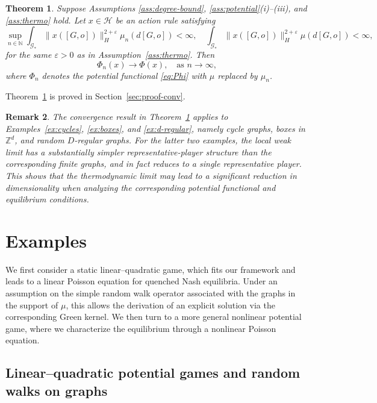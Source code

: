 \documentclass[11pt]{article}
\def\eps{\varepsilon}
\newcommand{\N}{{\mathbb N}}
\newtheorem{theorem}{Theorem}[section]
\newtheorem{remark}[theorem]{Remark}
\numberwithin{equation}{section}
\begin{document}
\begin{theorem}\label{thm:thermo-limit}
Suppose Assumptions \ref{ass:degree-bound}, \ref{ass:potential}(i)--(iii), and \ref{ass:thermo} hold. Let \(x\in\mathcal H\) be an action rule satisfying
\begin{equation}\label{eq:thermo-x}
\sup_{n\in\N}\int_{\mathcal G_\ast}\|x([G,o])\|_H^{2+\eps}\mu_n(d[G,o])<\infty,\quad \int_{\mathcal G_\ast}\|x([G,o])\|_H^{2+\eps}\mu(d[G,o])<\infty,
\end{equation}
for the same \(\eps>0\) as in Assumption~\ref{ass:thermo}. Then
\[
\Phi_n(x)\longrightarrow \Phi(x),
\quad \text{as } n \to \infty,
\]
where \(\Phi_n\) denotes the potential functional \eqref{eq:Phi} with \(\mu\) replaced by \(\mu_n\).
\end{theorem}
Theorem~\ref{thm:thermo-limit} is proved in Section~\ref{sec:proof-conv}.
\begin{remark}
The convergence result in Theorem~\ref{thm:thermo-limit} applies to Examples~\ref{ex:cycles}, \ref{ex:boxes}, and \ref{ex:d-regular}, namely cycle graphs, boxes in \(\mathbb Z^d\), and random \(D\)-regular graphs. For the latter two examples, the local weak limit has a substantially simpler representative-player structure than the corresponding finite graphs, and in fact reduces to a single representative player. This shows that the thermodynamic limit may lead to a significant reduction in dimensionality when analyzing the corresponding potential functional and equilibrium conditions.
\end{remark}


\section{Examples}\label{sec:examples}

We first consider a static linear–quadratic game, which fits our framework and leads to a linear Poisson equation for quenched Nash equilibria. Under an assumption on the simple random walk operator associated with the graphs in the support of $\mu$, this allows the derivation of an explicit solution via the corresponding Green kernel. We then turn to a more general nonlinear potential game, where we characterize the equilibrium through a nonlinear Poisson equation.

\subsection{Linear--quadratic potential games and random walks on graphs}\label{sec:lq-example}
\end{document}
